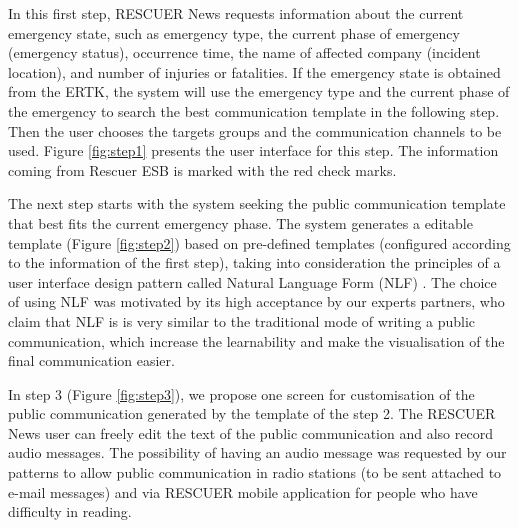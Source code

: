 
In this first step, RESCUER News requests information about the current emergency state, such as emergency type, the current phase of emergency (emergency status), occurrence time, the name of affected company (incident location), and number of injuries or fatalities. If the emergency state is obtained from the ERTK, the system will use the emergency type and the current phase of the emergency to search the best communication template in the following step.
Then the user chooses the targets groups and the communication channels to be used. Figure \ref{fig:step1} presents the user interface for this step. The information coming from Rescuer ESB is marked with the red check marks.



The next step starts with the system seeking the public communication template that best fits
the current emergency phase. The system generates a editable template (Figure \ref{fig:step2}) based on pre-defined templates (configured according to the information of the first step), taking into consideration the principles of a user interface design pattern called Natural Language Form (NLF) \citep{nlf}. The choice of using NLF was motivated by its high acceptance by our experts partners, who claim that NLF is is very similar to the traditional mode of writing a public communication, which increase the learnability and make the visualisation of the final communication easier.


In step 3 (Figure \ref{fig:step3}), we propose one screen for customisation of the public communication generated by the template of the step 2. The RESCUER News user can freely edit the text of the public communication and also record audio messages. The possibility of having an audio message was requested by our patterns to allow public communication in radio stations (to be sent attached to e-mail messages) and via RESCUER mobile application for people who have difficulty in reading.

